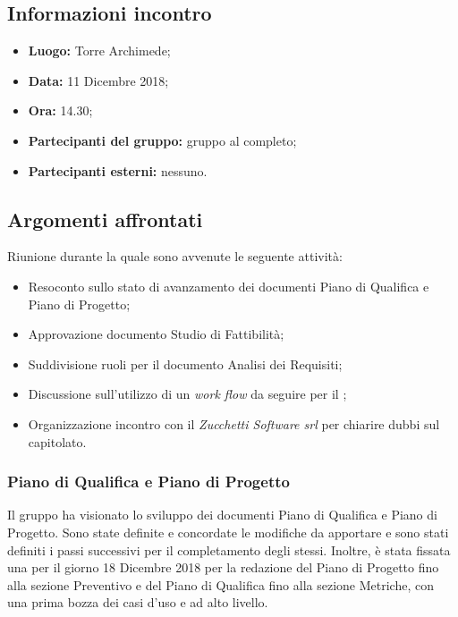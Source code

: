 \subsection{Informazioni incontro}
\begin{itemize}
	\item { \textbf{Luogo:} Torre Archimede;  }
	\item { \textbf{Data:} 11 Dicembre 2018; }
	\item { \textbf{Ora:} 14.30; }
	\item { \textbf{Partecipanti del gruppo:} gruppo al completo; }
	\item { \textbf{Partecipanti esterni:} nessuno. }
\end{itemize}


\subsection{Argomenti affrontati}
Riunione durante la quale sono avvenute le seguente attività:
\begin{itemize}
	\item{Resoconto sullo stato di avanzamento dei documenti Piano di Qualifica e Piano di Progetto;}
	\item{Approvazione documento Studio di Fattibilità;}
	\item{Suddivisione ruoli per il documento Analisi dei Requisiti;}
	\item{Discussione sull'utilizzo di un \emph{work flow} da seguire per il ;}
	\item{Organizzazione incontro con il  \emph{Zucchetti Software srl} per chiarire dubbi sul capitolato. }
\end{itemize}

\subsubsection{Piano di Qualifica e Piano di Progetto}
Il gruppo ha visionato lo sviluppo dei documenti Piano di Qualifica e Piano di Progetto. Sono state definite e concordate le modifiche da apportare e sono stati definiti i passi successivi per il completamento degli stessi. Inoltre, è stata fissata una  per il giorno 18 Dicembre 2018 per la redazione del Piano di Progetto fino alla sezione Preventivo e del Piano di Qualifica fino alla sezione Metriche, con una prima bozza dei casi d'uso e  ad alto livello.


